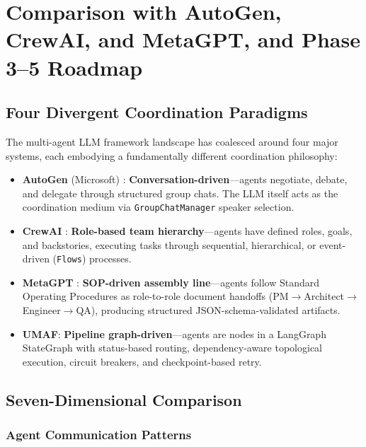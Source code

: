 \section{Comparison with AutoGen, CrewAI, and MetaGPT, and Phase 3--5 Roadmap}
\label{sec:comparison}

\subsection{Four Divergent Coordination Paradigms}

The multi-agent LLM framework landscape has coalesced around four major systems, each embodying a fundamentally different coordination philosophy:

\begin{itemize}
    \item \textbf{AutoGen} (Microsoft) \cite{autogen}: \textbf{Conversation-driven}---agents negotiate, debate, and delegate through structured group chats. The LLM itself acts as the coordination medium via \texttt{GroupChatManager} speaker selection.
    \item \textbf{CrewAI} \cite{crewai}: \textbf{Role-based team hierarchy}---agents have defined roles, goals, and backstories, executing tasks through sequential, hierarchical, or event-driven (\texttt{Flows}) processes.
    \item \textbf{MetaGPT} \cite{metagpt}: \textbf{SOP-driven assembly line}---agents follow Standard Operating Procedures as role-to-role document handoffs (PM$\rightarrow$Architect$\rightarrow$Engineer$\rightarrow$QA), producing structured JSON-schema-validated artifacts.
    \item \textbf{UMAF}: \textbf{Pipeline graph-driven}---agents are nodes in a LangGraph StateGraph with status-based routing, dependency-aware topological execution, circuit breakers, and checkpoint-based retry.
\end{itemize}

\subsection{Seven-Dimensional Comparison}

\subsubsection{Agent Communication Patterns}

